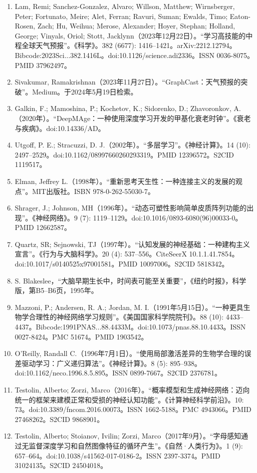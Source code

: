 \begin{enumerate}
\item Lam, Remi; Sanchez-Gonzalez, Alvaro; Willson, Matthew; Wirnsberger, Peter; Fortunato, Meire; Alet, Ferran; Ravuri, Suman; Ewalds, Timo; Eaton-Rosen, Zach; Hu, Weihua; Merose, Alexander; Hoyer, Stephan; Holland, George; Vinyals, Oriol; Stott, Jacklynn（2023年12月22日）。“学习高技能的中程全球天气预报”。《科学》。382 (6677): 1416–1421。arXiv:2212.12794。Bibcode:2023Sci...382.1416L。doi:10.1126/science.adi2336。ISSN 0036-8075。PMID 37962497。
\item Sivakumar, Ramakrishnan（2023年11月27日）。“GraphCast：天气预报的突破”。Medium。于2024年5月19日检索。
\item Galkin, F.; Mamoshina, P.; Kochetov, K.; Sidorenko, D.; Zhavoronkov, A.（2020年）。“DeepMAge：一种使用深度学习开发的甲基化衰老时钟”。《衰老与疾病》。doi:10.14336/AD。
\item Utgoff, P. E.; Stracuzzi, D. J.（2002年）。“多层学习”。《神经计算》。14 (10): 2497–2529。doi:10.1162/08997660260293319。PMID 12396572。S2CID 1119517。
\item Elman, Jeffrey L.（1998年）。“重新思考天生性：一种连接主义的发展的观点”。MIT出版社。ISBN 978-0-262-55030-7。
\item Shrager, J.; Johnson, MH（1996年）。“动态可塑性影响简单皮质阵列功能的出现”。《神经网络》。9 (7): 1119–1129。doi:10.1016/0893-6080(96)00033-0。PMID 12662587。
\item Quartz, SR; Sejnowski, TJ（1997年）。“认知发展的神经基础：一种建构主义宣言”。《行为与大脑科学》。20 (4): 537–556。CiteSeerX 10.1.1.41.7854。doi:10.1017/s0140525x97001581。PMID 10097006。S2CID 5818342。
\item S. Blakeslee，“大脑早期生长中，时间表可能至关重要”，《纽约时报》，科学版，第B5–B6页，1995年。
\item Mazzoni, P.; Andersen, R. A.; Jordan, M. I.（1991年5月15日）。“一种更具生物学合理性的神经网络学习规则”。《美国国家科学院院刊》。88 (10): 4433–4437。Bibcode:1991PNAS...88.4433M。doi:10.1073/pnas.88.10.4433。ISSN 0027-8424。PMC 51674。PMID 1903542。
\item O'Reilly, Randall C.（1996年7月1日）。“使用局部激活差异的生物学合理的误差驱动学习：广义递归算法”。《神经计算》。8 (5): 895–938。doi:10.1162/neco.1996.8.5.895。ISSN 0899-7667。S2CID 2376781。
\item Testolin, Alberto; Zorzi, Marco（2016年）。“概率模型和生成神经网络：迈向统一的框架来建模正常和受损的神经认知功能”。《计算神经科学前沿》。10: 73。doi:10.3389/fncom.2016.00073。ISSN 1662-5188。PMC 4943066。PMID 27468262。S2CID 9868901。
\item Testolin, Alberto; Stoianov, Ivilin; Zorzi, Marco（2017年9月）。“字母感知通过无监督深度学习和自然图像特征的循环产生”。《自然·人类行为》。1 (9): 657–664。doi:10.1038/s41562-017-0186-2。ISSN 2397-3374。PMID 31024135。S2CID 24504018。
\end{enumerate}